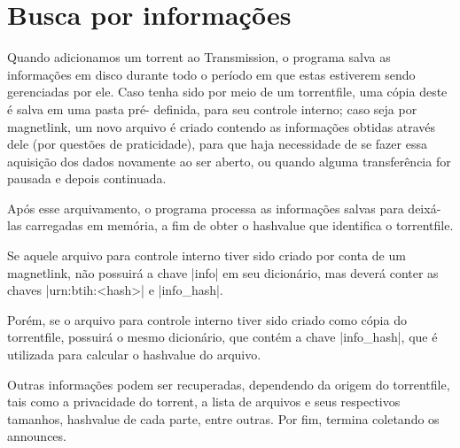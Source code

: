 
\newpage
\section{Busca por informações}

Quando adicionamos um \gls*{torrent} ao Transmission, o programa salva as informações em
disco durante todo o período em que estas estiverem sendo gerenciadas por ele. Caso
tenha sido por meio de um \gls*{torrentfile}, uma cópia deste é salva em uma pasta pré-
definida, para seu controle interno; caso seja por \gls*{magnetlink}, um novo arquivo é
criado contendo as informações obtidas através dele (por questões de praticidade), para
que haja necessidade de se fazer essa aquisição dos dados novamente ao ser aberto, ou
quando alguma transferência for pausada e depois continuada.

Após esse arquivamento, o programa processa as informações salvas para deixá-las
carregadas em memória, a fim de obter o \gls*{hashvalue} que identifica o
\gls*{torrentfile}.


Se aquele arquivo para controle interno tiver sido criado por conta de um
\gls*{magnetlink}, não possuirá a chave \bverb|info| em seu dicionário, mas deverá
conter as chaves \bverb|urn:btih:<hash>| e \bverb|info_hash|.


Porém, se o arquivo para controle interno tiver sido criado como cópia do
\gls*{torrentfile}, possuirá o mesmo dicionário, que contém a chave \bverb|info_hash|,
que é utilizada para calcular o \gls*{hashvalue} do arquivo.


Outras informações podem ser recuperadas, dependendo da origem do \gls*{torrentfile},
tais como a privacidade do \gls*{torrent}, a lista de arquivos e seus respectivos
tamanhos, \gls*{hashvalue} de cada parte, entre outras. Por fim, termina coletando os
\glspl{announce}.









